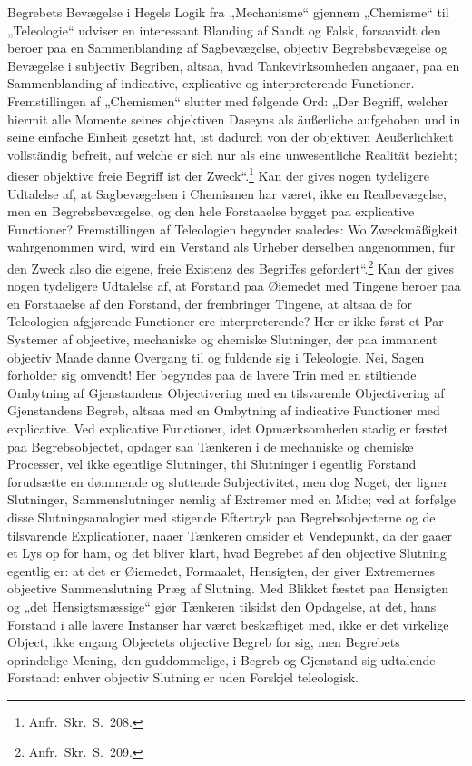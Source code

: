 \documentclass[12pt]{book}
\newcommand{\opage}[1]{\marginnote{\footnotesize\textit{[#1]}}}
\begin{document}
Begrebets Bevægelse i Hegels Logik fra „Mechanisme“ gjennem „Chemisme“ til „Teleologie“ udviser en interessant Blanding af Sandt og Falsk, forsaavidt den beroer paa en Sammenblanding af Sagbevægelse, objectiv Begrebsbevægelse og Bevægelse i subjectiv Begriben, altsaa, hvad Tankevirksomheden angaaer, paa en Sammenblanding af indicative, explicative og interpreterende Functioner. Fremstillingen af „Chemismen“ slutter med følgende Ord: „Der Begriff, welcher hiermit alle Momente seines objektiven Daseyns als äußerliche aufgehoben und in seine einfache Einheit gesetzt hat, ist dadurch von der objektiven Aeußerlichkeit vollständig befreit, auf welche er sich nur als eine unwesentliche Realität bezieht; dieser objektive freie Begriff ist der Zweck“.\footnote{Anfr.\ Skr.\ S.~208.}%
 Kan der gives nogen tydeligere Udtalelse af, at Sagbevægelsen i Chemismen har været, ikke en Realbevægelse, men en Begrebsbevægelse, og den hele Forstaaelse bygget paa explicative Functioner? Fremstillingen af Teleologien begynder saaledes: Wo Zweckmäßigkeit wahrgenommen wird, wird ein Verstand als Urheber derselben angenommen, für den Zweck also die eigene, freie Existenz des Begriffes gefordert“.\footnote{Anfr.\ Skr.\ S.~209.}%
Kan der gives nogen tydeligere Udtalelse af, at Forstand paa Øiemedet med Tingene beroer paa en Forstaaelse af den Forstand, der frembringer Tingene, at altsaa de for Teleologien afgjørende Functioner ere interpreterende? Her er ikke først et Par Systemer af objective, mechaniske og chemiske Slutninger, der paa immanent objectiv Maade danne Overgang til og fuldende sig i Teleologie. Nei, Sagen forholder sig omvendt! Her begyndes paa de lavere Trin med en stiltiende Ombytning af Gjenstandens Objectivering med en tilsvarende Objectivering af Gjenstandens
\opage{390}Begreb, altsaa med en Ombytning af indicative Functioner med explicative. Ved explicative Functioner, idet Opmærksomheden stadig er fæstet paa Begrebsobjectet, opdager saa Tænkeren i de mechaniske og chemiske Processer, vel ikke egentlige Slutninger, thi Slutninger i egentlig Forstand forudsætte en dømmende og sluttende Subjectivitet, men dog Noget, der ligner Slutninger, Sammenslutninger nemlig af Extremer med en Midte; ved at forfølge disse Slutningsanalogier med stigende Eftertryk paa Begrebsobjecterne og de tilsvarende Explicationer, naaer Tænkeren omsider et Vendepunkt, da der gaaer et Lys op for ham, og det bliver klart, hvad Begrebet af den objective Slutning egentlig er: at det er Øiemedet, Formaalet, Hensigten, der giver Extremernes objective Sammenslutning Præg af Slutning. Med Blikket fæstet paa Hensigten og „det Hensigtsmæssige“ gjør Tænkeren tilsidst den Opdagelse, at det, hans Forstand i alle lavere Instanser har været beskæftiget med, ikke er det virkelige Object, ikke engang Objectets objective Begreb for sig, men Begrebets oprindelige Mening, den guddommelige, i Begreb og Gjenstand sig udtalende Forstand: enhver objectiv Slutning er uden Forskjel teleologisk.
\end{document}
